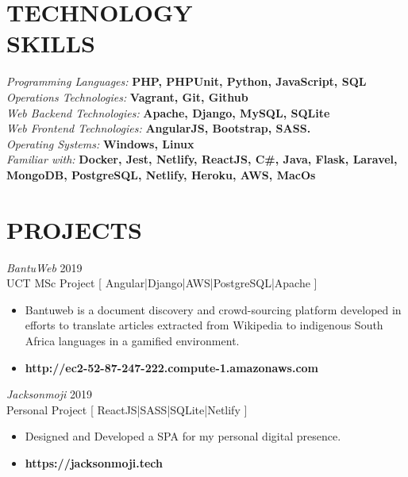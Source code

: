 \documentclass[margin, 10pt]{res}
\begin{document}
\begin{resume}


\section{TECHNOLOGY \\ SKILLS} 

{\sl Programming Languages:} \textbf{PHP, PHPUnit, Python, JavaScript, SQL} \\
{\sl Operations Technologies:}\textbf{ Vagrant, Git, Github} \\
{\sl Web Backend Technologies:} \textbf{ Apache, Django, MySQL, SQLite } \\
{\sl Web Frontend Technologies:} \textbf{ AngularJS, Bootstrap, SASS.} \\
{\sl Operating Systems:} \textbf{ Windows, Linux } \\
{\sl Familiar with:} \textbf{Docker, Jest, Netlify, ReactJS, C\#, Java, Flask, Laravel, MongoDB, PostgreSQL, Netlify, Heroku, AWS, MacOs} \\


\section{PROJECTS}

{\sl BantuWeb} \hfill 2019 \\
UCT MSc Project [ Angular|Django|AWS|PostgreSQL|Apache ]
\begin{itemize} \itemsep -2pt %
\item Bantuweb is a document discovery and crowd-sourcing platform developed in efforts to translate articles extracted from Wikipedia to indigenous South Africa languages in a gamified environment.
\item \textbf{http://ec2-52-87-247-222.compute-1.amazonaws.com}
\end{itemize}

{\sl Jacksonmoji} \hfill 2019 \\
Personal Project [ ReactJS|SASS|SQLite|Netlify ]
\begin{itemize} \itemsep -2pt %
\item Designed and Developed a SPA for my personal digital presence.
\item \textbf{https://jacksonmoji.tech}
\end{itemize}



\end{resume}
\end{document}
